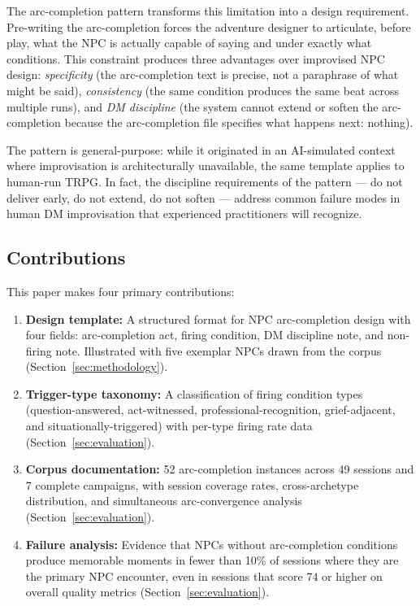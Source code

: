 The arc-completion pattern transforms this limitation into a design
requirement. Pre-writing the arc-completion forces the adventure designer
to articulate, before play, what the NPC is actually capable of saying and
under exactly what conditions. This constraint produces three advantages
over improvised NPC design: \textit{specificity} (the arc-completion text
is precise, not a paraphrase of what might be said), \textit{consistency}
(the same condition produces the same beat across multiple runs), and
\textit{DM discipline} (the system cannot extend or soften the arc-completion
because the arc-completion file specifies what happens next: nothing).

The pattern is general-purpose: while it originated in an AI-simulated
context where improvisation is architecturally unavailable, the same
template applies to human-run TRPG. In fact, the discipline requirements
of the pattern --- do not deliver early, do not extend, do not soften ---
address common failure modes in human DM improvisation that experienced
practitioners will recognize.

\subsection{Contributions}

This paper makes four primary contributions:

\begin{enumerate}
  \item \textbf{Design template:} A structured format for NPC arc-completion
    design with four fields: arc-completion act, firing condition, DM
    discipline note, and non-firing note. Illustrated with five exemplar
    NPCs drawn from the corpus (Section~\ref{sec:methodology}).

  \item \textbf{Trigger-type taxonomy:} A classification of firing condition
    types (question-answered, act-witnessed, professional-recognition,
    grief-adjacent, and situationally-triggered) with per-type firing
    rate data (Section~\ref{sec:evaluation}).

  \item \textbf{Corpus documentation:} 52 arc-completion instances across
    49 sessions and 7 complete campaigns, with session coverage rates,
    cross-archetype distribution, and simultaneous arc-convergence analysis
    (Section~\ref{sec:evaluation}).

  \item \textbf{Failure analysis:} Evidence that NPCs without arc-completion
    conditions produce memorable moments in fewer than 10\% of sessions where
    they are the primary NPC encounter, even in sessions that score 74 or
    higher on overall quality metrics (Section~\ref{sec:evaluation}).
\end{enumerate}

